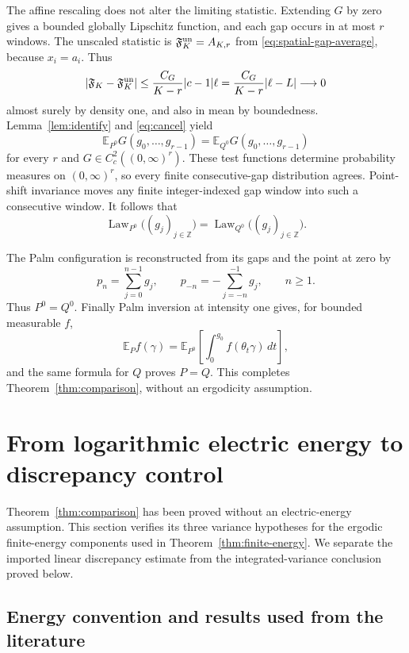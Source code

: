 \documentclass[11pt,reqno]{amsart}
\numberwithin{equation}{section}
\theoremstyle{definition}
\theoremstyle{remark}
\newcommand{\Z}{\mathbb Z}
\newcommand{\E}{\mathbb E}
\newcommand{\1}{\mathbf 1}
\DeclareMathOperator{\Law}{Law}
\newcommand{\dd}{\,d}
\begin{document}
The affine rescaling does not alter the limiting statistic. Extending
$G$ by zero gives a bounded globally Lipschitz function, and each gap
occurs in at most $r$ windows. The unscaled statistic is $\mathfrak F_K^{\rm un}=A_{K,r}$ from
\eqref{eq:spatial-gap-average}, because $x_i=a_i$. Thus
\[
|\mathfrak F_K-\mathfrak F_K^{\rm un}|
\le\frac{C_G}{K-r}|c-1|\ell
=\frac{C_G}{K-r}|\ell-L|\longrightarrow0
\]
almost surely by density one, and also in mean by boundedness.
Lemma~\ref{lem:identify} and \eqref{eq:cancel} yield
\[
\E_{P^0}G(g_0,\ldots,g_{r-1})
=\E_{Q^0}G(g_0,\ldots,g_{r-1})
\]
for every $r$ and $G\in C_c^2((0,\infty)^r)$.
These test functions determine probability measures on
$(0,\infty)^r$, so every finite consecutive-gap distribution agrees.
Point-shift invariance moves any finite integer-indexed gap window
into such a consecutive window. It follows that
\begin{equation}\label{eq:gap-law-equality}
\Law_{P^0}\bigl((g_j)_{j\in\Z}\bigr)
 =\Law_{Q^0}\bigl((g_j)_{j\in\Z}\bigr).
\end{equation}

The Palm configuration is reconstructed from its gaps and the point
at zero by
\[
p_n=\sum_{j=0}^{n-1}g_j,\qquad
p_{-n}=-\sum_{j=-n}^{-1}g_j,\qquad n\ge1.
\]
Thus $P^0=Q^0$. Finally Palm inversion at intensity one gives, for
bounded measurable $f$,
\[
\E_P f(\gamma)=
\E_{P^0}\left[\int_0^{g_0}f(\theta_t\gamma)\dd t\right],
\]
and the same formula for $Q$ proves $P=Q$. This completes
Theorem~\ref{thm:comparison}, without an ergodicity assumption.


\section{From logarithmic electric energy to discrepancy control}
\label{sec:energy}

Theorem~\ref{thm:comparison} has been proved without an electric-energy
assumption. This section verifies its three variance hypotheses for
the ergodic finite-energy components used in
Theorem~\ref{thm:finite-energy}. We separate the imported linear
discrepancy estimate from the integrated-variance conclusion proved
below.

\subsection{Energy convention and results used from the literature}
\end{document}

